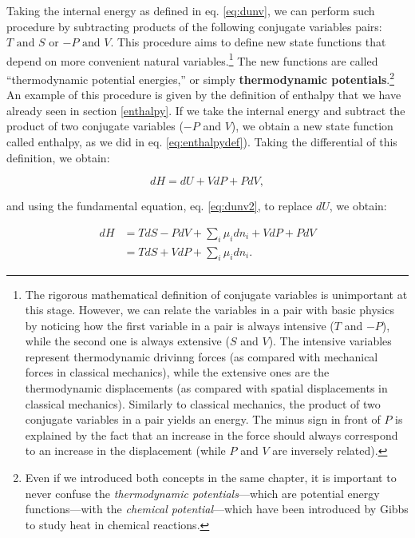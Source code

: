 \documentclass[
  9pt,
]{extbook}
\theoremstyle{definition}
\theoremstyle{definition}
\theoremstyle{definition}
\theoremstyle{remark}
\begin{document}
Taking the internal energy as defined in eq. \eqref{eq:dunv}, we can perform such procedure by subtracting products of the following conjugate variables pairs: \(T \text{ and } S\) or \(-P \text{ and } V\). This procedure aims to define new state functions that depend on more convenient natural variables.\footnote{The rigorous mathematical definition of conjugate variables is unimportant at this stage. However, we can relate the variables in a pair with basic physics by noticing how the first variable in a pair is always intensive (\(T\) and \(-P\)), while the second one is always extensive (\(S\) and \(V\)). The intensive variables represent thermodynamic drivinng forces (as compared with mechanical forces in classical mechanics), while the extensive ones are the thermodynamic displacements (as compared with spatial displacements in classical mechanics). Similarly to classical mechanics, the product of two conjugate variables in a pair yields an energy. The minus sign in front of \(P\) is explained by the fact that an increase in the force should always correspond to an increase in the displacement (while \(P\) and \(V\) are inversely related).} The new functions are called ``thermodynamic potential energies,'' or simply \textbf{thermodynamic potentials}.\footnote{Even if we introduced both concepts in the same chapter, it is important to never confuse the \emph{thermodynamic potentials}---which are potential energy functions---with the \emph{chemical potential}---which have been introduced by Gibbs to study heat in chemical reactions.} An example of this procedure is given by the definition of enthalpy that we have already seen in section \ref{enthalpy}. If we take the internal energy and subtract the product of two conjugate variables (\(-P\) and \(V\)), we obtain a new state function called enthalpy, as we did in eq. \eqref{eq:enthalpydef}). Taking the differential of this definition, we obtain:

\begin{equation}
dH = dU +VdP +PdV,
\label{eq:dhdef1}
\end{equation}

and using the fundamental equation, eq. \eqref{eq:dunv2}, to replace \(dU\), we obtain:

\begin{equation}
\begin{aligned}
dH & = TdS -PdV +\sum_i\mu_i dn_i +VdP +PdV  \\
   & = TdS +VdP +\sum_i\mu_i dn_i.
\end{aligned}
\label{eq:dhdef2}
\end{equation}
\end{document}
